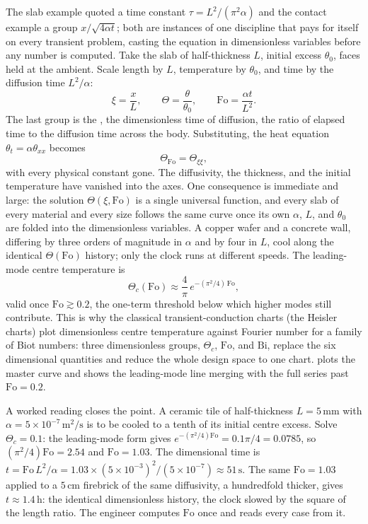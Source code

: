 The slab example quoted a time constant $\tau = L^{2}/(\pi^{2}\alpha)$
and the contact example a group $x/\sqrt{4\alpha t}$; both are
instances of one discipline that pays for itself on every transient
problem, casting the equation in dimensionless variables before any
number is computed. Take the slab of half-thickness $L$, initial
excess $\theta_{0}$, faces held at the ambient. Scale length by $L$,
temperature by $\theta_{0}$, and time by the diffusion time
$L^{2}/\alpha$:
\[
\xi = \frac{x}{L}, \qquad \Theta = \frac{\theta}{\theta_{0}},
\qquad \mathrm{Fo} = \frac{\alpha t}{L^{2}}.
\]
The last group is the , the dimensionless
time of diffusion, the ratio of elapsed time to the diffusion time
across the body. Substituting, the heat equation $\theta_{t} =
\alpha\theta_{xx}$ becomes
\[
\Theta_{\mathrm{Fo}} = \Theta_{\xi\xi},
\]
with every physical constant gone. The diffusivity, the thickness,
and the initial temperature have vanished into the axes. One
consequence is immediate and large: the solution $\Theta(\xi,
\mathrm{Fo})$ is a single universal function, and every slab of every
material and every size follows the same curve once its own $\alpha$,
$L$, and $\theta_{0}$ are folded into the dimensionless variables. A
copper wafer and a concrete wall, differing by three orders of
magnitude in $\alpha$ and by four in $L$, cool along the identical
$\Theta(\mathrm{Fo})$ history; only the clock runs at different
speeds. The leading-mode centre temperature is
\[
\Theta_{c}(\mathrm{Fo}) \approx \frac{4}{\pi}\,
e^{-(\pi^{2}/4)\,\mathrm{Fo}},
\]
valid once $\mathrm{Fo} \gtrsim 0.2$, the one-term threshold below
which higher modes still contribute. This is why the classical
transient-conduction charts (the Heisler charts) plot dimensionless
centre temperature against Fourier number for a family of Biot
numbers: three dimensionless groups, $\Theta_{c}$, $\mathrm{Fo}$, and
$\mathrm{Bi}$, replace the six dimensional quantities and reduce the
whole design space to one chart.
 plots the master curve and shows
the leading-mode line merging with the full series past
$\mathrm{Fo} = 0.2$.



A worked reading closes the point. A ceramic tile of half-thickness
$L = 5\,\si{\milli\meter}$ with $\alpha = 5 \times 10^{-7}\,\si{
\meter\squared\per\second}$ is to be cooled to a tenth of its initial
centre excess. Solve $\Theta_{c} = 0.1$: the leading-mode form gives
$e^{-(\pi^{2}/4)\mathrm{Fo}} = 0.1\pi/4 = 0.0785$, so
$(\pi^{2}/4)\mathrm{Fo} = 2.54$ and $\mathrm{Fo} = 1.03$. The
dimensional time is $t = \mathrm{Fo}\,L^{2}/\alpha = 1.03 \times (5
\times 10^{-3})^{2}/(5 \times 10^{-7}) \approx 51\,\si{\second}$. The
same $\mathrm{Fo} = 1.03$ applied to a $5\,\si{\centi\meter}$
firebrick of the same diffusivity, a hundredfold thicker, gives
$t \approx 1.4\,\si{\hour}$: the identical dimensionless history, the
clock slowed by the square of the length ratio. The engineer computes
$\mathrm{Fo}$ once and reads every case from it.

